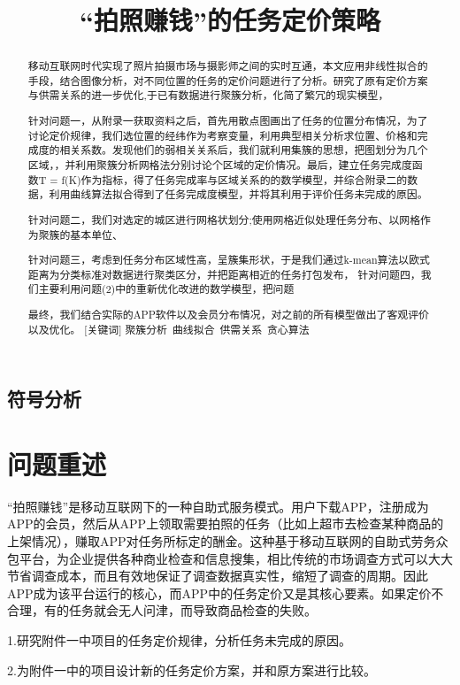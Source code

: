 \documentclass{ctexart}
\title{“拍照赚钱”的任务定价策略}
\date{}
\begin{document}
\maketitle
\begin{abstract}
移动互联网时代实现了照片拍摄市场与摄影师之间的实时互通，本文应用非线性拟合的手段，结合图像分析，对不同位置的任务的定价问题进行了分析。研究了原有定价方案与供需关系的进一步优化,于已有数据进行聚簇分析，化简了繁冗的现实模型，

针对问题一，从附录一获取资料之后，首先用散点图画出了任务的位置分布情况，为了讨论定价规律，我们选位置的经纬作为考察变量，利用典型相关分析求位置、价格和完成度的相关系数。发现他们的弱相关关系后，我们就利用集簇的思想，把图划分为几个区域，，并利用聚簇分析网格法分别讨论个区域的定价情况。最后，建立任务完成度函数T = f(K)作为指标，得了任务完成率与区域关系的的数学模型，并综合附录二的数据，利用曲线算法拟合得到了任务完成度模型，并将其利用于评价任务未完成的原因。

针对问题二，我们对选定的城区进行网格状划分;使用网格近似处理任务分布、以网格作为聚簇的基本单位、

针对问题三，考虑到任务分布区域性高，呈簇集形状，于是我们通过k-mean算法以欧式距离为分类标准对数据进行聚类区分，并把距离相近的任务打包发布，
针对问题四，我们主要利用问题(2)中的重新优化改进的数学模型，把问题

最终，我们结合实际的APP软件以及会员分布情况，对之前的所有模型做出了客观评价以及优化。
[关键词] 聚簇分析\ 曲线拟合\ 供需关系\ 贪心算法\ 
\end{abstract}
\newpage
\subsection{符号分析}
\section{问题重述}
“拍照赚钱”是移动互联网下的一种自助式服务模式。用户下载APP，注册成为APP的会员，然后从APP上领取需要拍照的任务（比如上超市去检查某种商品的上架情况），赚取APP对任务所标定的酬金。这种基于移动互联网的自助式劳务众包平台，为企业提供各种商业检查和信息搜集，相比传统的市场调查方式可以大大节省调查成本，而且有效地保证了调查数据真实性，缩短了调查的周期。因此APP成为该平台运行的核心，而APP中的任务定价又是其核心要素。如果定价不合理，有的任务就会无人问津，而导致商品检查的失败。

1.研究附件一中项目的任务定价规律，分析任务未完成的原因。

2.为附件一中的项目设计新的任务定价方案，并和原方案进行比较。
\end{document}
